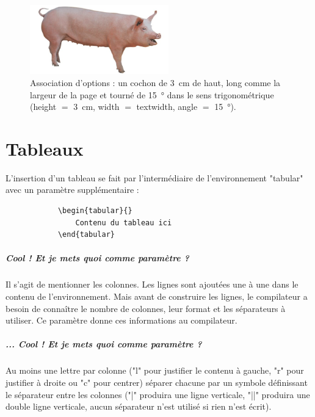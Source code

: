 \documentclass[a4paper, 13pt]{report} %
\begin{document}
			\begin{figure}[h!]\centering
				\includegraphics[height=3cm, width=\textwidth, angle=15]{dimensions/cochon.jpg}
				\caption{Association d'options : un cochon de \SI{3}{\centi\meter} de haut, long comme la largeur de la page et tourné de \SI{15}{\degree} dans le sens trigonométrique (height $=$ \SI{3}{\centi\meter}, width $=$ textwidth, angle $=$ \SI{15}{\degree}).}
			\end{figure}
	
	\chapter{Tableaux}
		L'insertion d'un tableau se fait par l'intermédiaire de l'environnement "tabular" avec un paramètre supplémentaire :
		\begin{verbatim}
			\begin{tabular}{}
				Contenu du tableau ici
			\end{tabular}
		\end{verbatim}
		\paragraph{Cool ! Et je mets quoi comme paramètre ?\\}
			Il s'agit de mentionner les colonnes. Les lignes sont ajoutées une à une dans le contenu de l'environnement. Mais avant de construire les lignes, le compilateur a besoin de connaître le nombre de colonnes, leur format et les séparateurs à utiliser. Ce paramètre donne ces informations au compilateur.
		\paragraph{... Cool ! Et je mets quoi comme paramètre ?\\}
			Au moins une lettre par colonne ("l" pour justifier le contenu à gauche, "r" pour justifier à droite ou "c" pour centrer) séparer chacune par un symbole définissant le séparateur entre les colonnes ("|" produira une ligne verticale, "||" produira une double ligne verticale, aucun séparateur n'est utilisé si rien n'est écrit).
\end{document}
